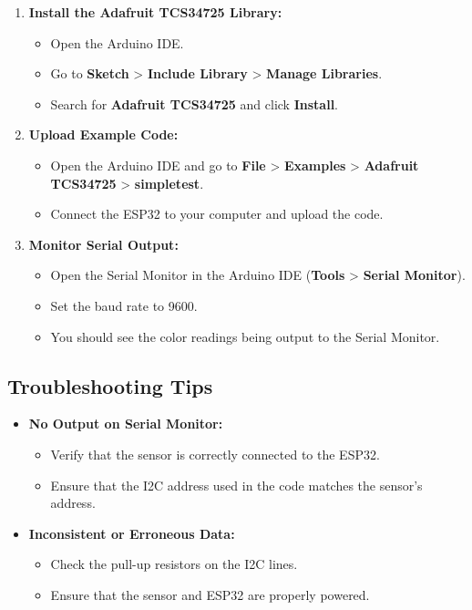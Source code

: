 \begin{enumerate}[label=\arabic*.]
	\item \textbf{Install the Adafruit TCS34725 Library:}
	\begin{itemize}
		\item Open the Arduino IDE.
		\item Go to \textbf{Sketch} > \textbf{Include Library} > \textbf{Manage Libraries}.
		\item Search for \textbf{Adafruit TCS34725} and click \textbf{Install}.
	\end{itemize}
	
	\item \textbf{Upload Example Code:}
	\begin{itemize}
		\item Open the Arduino IDE and go to \textbf{File} > \textbf{Examples} > \textbf{Adafruit TCS34725} > \textbf{simpletest}.
		\item Connect the ESP32 to your computer and upload the code.
	\end{itemize}
	
	\item \textbf{Monitor Serial Output:}
	\begin{itemize}
		\item Open the Serial Monitor in the Arduino IDE (\textbf{Tools} > \textbf{Serial Monitor}).
		\item Set the baud rate to 9600.
		\item You should see the color readings being output to the Serial Monitor.
	\end{itemize}
\end{enumerate}

\subsection*{Troubleshooting Tips}
\begin{itemize}
	\item \textbf{No Output on Serial Monitor:}
	\begin{itemize}
		\item Verify that the sensor is correctly connected to the ESP32.
		\item Ensure that the I2C address used in the code matches the sensor’s address.
	\end{itemize}
	
	\item \textbf{Inconsistent or Erroneous Data:}
	\begin{itemize}
		\item Check the pull-up resistors on the I2C lines.
		\item Ensure that the sensor and ESP32 are properly powered.
	\end{itemize}
\end{itemize}



